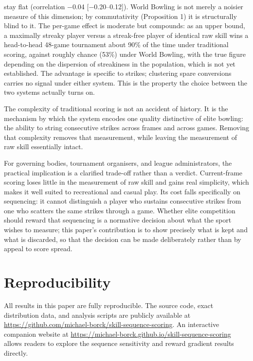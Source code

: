 \documentclass[
  letterpaper,
  DIV=11,
  numbers=noendperiod]{scrartcl}
\begin{document}
\begin{enumerate}
  stay flat (correlation −0.04 {[}−0.20--0.12{]}). World Bowling is not
  merely a noisier measure of this dimension; by commutativity
  (Proposition 1) it is structurally blind to it. The per-game effect is
  moderate but compounds: as an upper bound, a maximally streaky player
  versus a streak-free player of identical raw skill wins a head-to-head
  48-game tournament about 90\% of the time under traditional scoring,
  against roughly chance (53\%) under World Bowling, with the true
  figure depending on the dispersion of streakiness in the population,
  which is not yet established. The advantage is specific to strikes;
  clustering spare conversions carries no signal under either system.
  This is the property the choice between the two systems actually turns
  on.
\end{enumerate}

The complexity of traditional scoring is not an accident of history. It
is the mechanism by which the system encodes one quality distinctive of
elite bowling: the ability to string consecutive strikes across frames
and across games. Removing that complexity removes that measurement,
while leaving the measurement of raw skill essentially intact.

For governing bodies, tournament organisers, and league administrators,
the practical implication is a clarified trade-off rather than a
verdict. Current-frame scoring loses little in the measurement of raw
skill and gains real simplicity, which makes it well suited to
recreational and casual play. Its cost falls specifically on sequencing:
it cannot distinguish a player who sustains consecutive strikes from one
who scatters the same strikes through a game. Whether elite competition
should reward that sequencing is a normative decision about what the
sport wishes to measure; this paper's contribution is to show precisely
what is kept and what is discarded, so that the decision can be made
deliberately rather than by appeal to score spread.

\section*{Reproducibility}\label{reproducibility}

All results in this paper are fully reproducible. The source code, exact
distribution data, and analysis scripts are publicly available at
\url{https://github.com/michael-borck/skill-sequence-scoring}. An
interactive companion website at
\url{https://michael-borck.github.io/skill-sequence-scoring} allows
readers to explore the sequence sensitivity and reward gradient results
directly.
\end{document}
